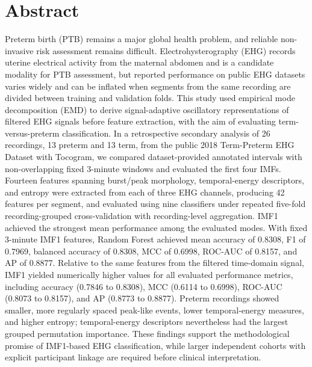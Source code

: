 \documentclass[10pt,letterpaper]{article}
\begin{document}

%
\section*{Abstract}
Preterm birth (PTB) remains a major global health problem, and reliable non-invasive risk assessment remains difficult. Electrohysterography (EHG) records uterine electrical activity from the maternal abdomen and is a candidate modality for PTB assessment, but reported performance on public EHG datasets varies widely and can be inflated when segments from the same recording are divided between training and validation folds. This study used empirical mode decomposition (EMD) to derive signal-adaptive oscillatory representations of filtered EHG signals before feature extraction, with the aim of evaluating term-versus-preterm classification. In a retrospective secondary analysis of 26 recordings, 13 preterm and 13 term, from the public 2018 Term-Preterm EHG Dataset with Tocogram, we compared dataset-provided annotated intervals with non-overlapping fixed 3-minute windows and evaluated the first four IMFs. Fourteen features spanning burst/peak morphology, temporal-energy descriptors, and entropy were extracted from each of three EHG channels, producing 42 features per segment, and evaluated using nine classifiers under repeated five-fold recording-grouped cross-validation with recording-level aggregation. IMF1 achieved the strongest mean performance among the evaluated modes. With fixed 3-minute IMF1 features, Random Forest achieved mean accuracy of 0.8308, F1 of 0.7969, balanced accuracy of 0.8308, MCC of 0.6998, ROC-AUC of 0.8157, and AP of 0.8877. Relative to the same features from the filtered time-domain signal, IMF1 yielded numerically higher values for all evaluated performance metrics, including accuracy (0.7846 to 0.8308), MCC (0.6114 to 0.6998), ROC-AUC (0.8073 to 0.8157), and AP (0.8773 to 0.8877). Preterm recordings showed smaller, more regularly spaced peak-like events, lower temporal-energy measures, and higher entropy; temporal-energy descriptors nevertheless had the largest grouped permutation importance. These findings support the methodological promise of IMF1-based EHG classification, while larger independent cohorts with explicit participant linkage are required before clinical interpretation.
\end{document}
